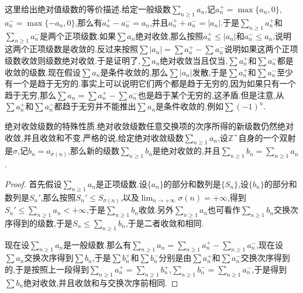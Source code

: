 这里给出绝对值级数的等价描述.给定一般级数$\sum_{n\ge1}a_n$,记$a_n^+=\max\{a_n,0\}$,$a_n^-=\max\{-a_n,0\}$,那么有$a_n^+-a_n^-=a_n$,并且$a_n^++a_n^-=|a_n|$.于是$\sum_{n\ge1}a_n^+$和$\sum_{n\ge1}a_n^-$是两个正项级数.如果$\sum a_n$绝对收敛,那么按照$a_n^+\le |a_n|$和$a_n^-\le a_n$,说明这两个正项级数是收敛的.反过来按照$\sum |a_n|=\sum a_n^+-\sum a_n^-$说明如果这两个正项级数收敛则级数绝对收敛.于是证明了,$\sum a_n$绝对收敛当且仅当,$\sum a_n^+$和$\sum a_n^-$都是收敛的级数.现在假设$\sum a_n$是条件收敛的,那么$\sum |a_n|$发散,于是$\sum a_n^+$和$\sum a_n^-$至少有一个是趋于无穷的.事实上可以说明它们两个都是趋于无穷的,因为如果只有一个趋于无穷,那么$\sum a_n=\sum a_n^+-\sum a_n^-$也是趋于某个无穷的,这矛盾.但是注意,从$\sum a_n^+$和$\sum a_n^-$都趋于无穷并不能推出$\sum a_n$是条件收敛的,例如$\sum (-1)^n$.

绝对收敛级数的特殊性质.绝对收敛级数任意交换项的次序所得的新级数仍然绝对收敛,并且收敛和不变.严格的说,给定绝对收敛级数$\sum_{n\ge1}a_n$,设$\mathbb{Z}^+$自身的一个双射是$\sigma$,记$b_n=a_{\sigma(n)}$,那么新的级数$\sum_{n\ge1}b_n$是绝对收敛的,并且$\sum_{n\ge1}b_n=\sum_{n\ge1}a_n$.
\begin{proof}
	
	首先假设$\sum_{n\ge1}a_n$是正项级数.设$\{a_n\}$的部分和数列是$\{S_n\}$,设$\{b_n\}$的部分和数列是$S_n'$,那么按照$S_n'\le S_{\sigma(n)}$,以及$\lim_{n\to+\infty}\sigma(n)=+\infty$,得到$S_n'\le\sum_{n\ge1}a_n<+\infty$,于是$\sum_{n\ge1}b_n$收敛.另外$\sum_{n\ge1}a_n$也可看作$\sum_{n\ge1}b_n$交换次序得到的级数,于是$S_n\le\sum_{n\ge1}b_n$,于是二者收敛和相同.
	
	现在设$\sum_{n\ge1}a_n$是一般级数.那么有$\sum_{n\ge1}a_n=\sum_{n\ge1}a_n^+-\sum_{n\ge1}a_n^-$,现在设$\sum a_n$交换次序得到$\sum b_n$,于是$\sum b_n^+$和$\sum b_n^-$分别是由$\sum a_n^+$和$\sum a_n^-$交换次序得到的,于是按照上一段得到$\sum_{n\ge1}a_n^+=\sum_{n\ge1}b_n^+$,$\sum_{n\ge1}b_n^-=\sum_{n\ge1}a_n^-$,于是得到$\sum b_n$绝对收敛,并且收敛和与交换次序前相同.
	
\end{proof}

